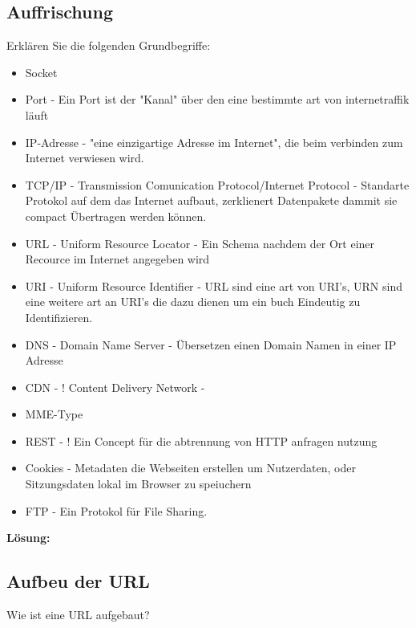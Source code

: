 \documentclass[11pt,a4paper,DIV=12]{scrartcl}
\date{\today}
\author{Aleksandar Hristov\\ (1722385)}
\newcommand{\loesung}{\textbf{Lösung:}\\}
\begin{document}
\maketitle       %

\subsection{Auffrischung}
Erklären Sie die folgenden Grundbegriffe:
\begin{itemize}
    \item Socket 
    \item Port - Ein Port ist der "Kanal" über den eine bestimmte art von internetraffik läuft
    \item IP-Adresse - "eine einzigartige Adresse im Internet", die beim verbinden zum Internet verwiesen wird.  
    \item TCP/IP - Transmission Comunication Protocol/Internet Protocol - Standarte Protokol auf dem das Internet aufbaut, zerklienert Datenpakete dammit sie compact Übertragen werden können.
    \item URL - Uniform Resource Locator - Ein Schema nachdem der Ort einer Recource im Internet angegeben wird
    \item URI - Uniform Resource Identifier - URL sind eine art von URI's, URN sind eine weitere art an URI's die dazu dienen um ein buch Eindeutig zu Identifizieren.  
    \item DNS - Domain Name Server - Übersetzen einen Domain Namen in einer IP Adresse 
    \item CDN - ! Content Delivery Network - 
    \item MME-Type
    \item REST - ! Ein Concept für die abtrennung von HTTP anfragen nutzung
    \item Cookies - Metadaten die Webseiten erstellen um Nutzerdaten, oder Sitzungsdaten lokal im Browser zu speiuchern  
    \item FTP - Ein Protokol für File Sharing.
\end{itemize}

\loesung

\subsection{Aufbeu der URL}
Wie ist eine URL aufgebaut?
\end{document}
